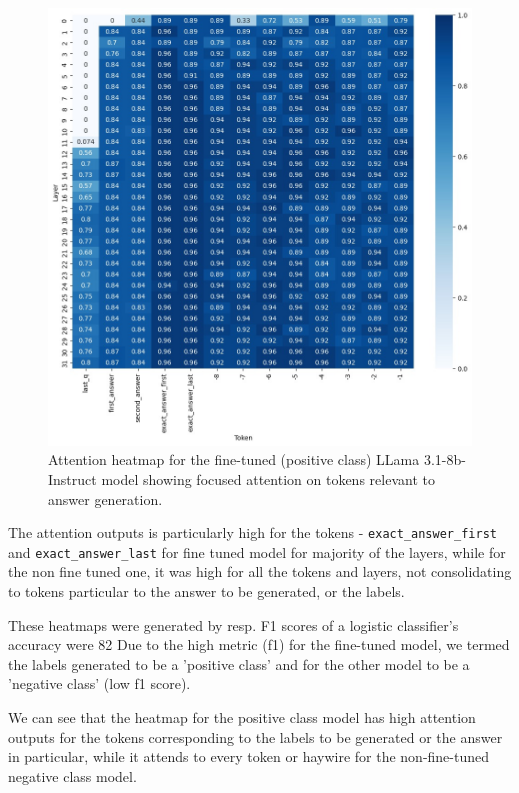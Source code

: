 \documentclass[sigconf, review]{acmart}
\begin{document}
\begin{enumerate}
     \begin{figure}[ht]
         \centering
         \includegraphics[width=0.9\columnwidth]{frank-positive-class.jpg}
         \caption{Attention heatmap for the fine-tuned (positive class) LLama 3.1-8b-Instruct model showing focused attention on tokens relevant to answer generation.}
         \label{fig:positive-class}
     \end{figure}

     The attention outputs is particularly high for the tokens - \texttt{exact\_answer\_first} and \texttt{exact\_answer\_last} for fine tuned model for majority of the layers, while for the non fine tuned one, it was high for all the tokens and layers, not consolidating to tokens particular to the answer to be generated, or the labels.
     
     These heatmaps were generated by resp. F1 scores of a logistic classifier's accuracy were 82%
     Due to the high metric (f1) for the fine-tuned model, we termed the labels generated to be a 'positive class' and for the other model to be a 'negative class' (low f1 score).
     
     We can see that the heatmap for the positive class model has high attention outputs for the tokens corresponding to the labels to be generated or the answer in particular, while it attends to every token or haywire for the non-fine-tuned negative class model.
     

\end{enumerate}
\end{document}
